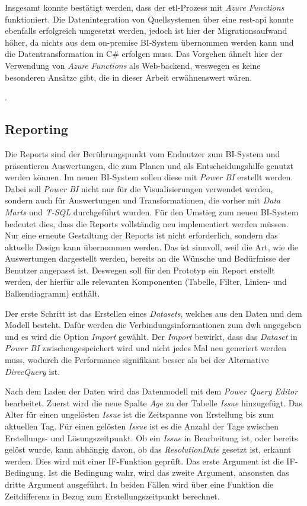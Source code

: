 Insgesamt konnte bestätigt werden, dass der \ac{etl}-Prozess mit \textit{Azure Functions} funktioniert. Die Datenintegration von Quellsystemen über eine \ac{rest}-\ac{api} konnte ebenfalls erfolgreich umgesetzt werden, jedoch ist hier der Migrationsaufwand höher, da nichts aus dem on-premise BI-System übernommen werden kann und die Datentransformation in C\# erfolgen muss. Das Vorgehen ähnelt hier der Verwendung von \textit{Azure Functions} als Web-backend, weswegen es keine besonderen Ansätze gibt, die in dieser Arbeit erwähnenswert wären.

\cite[vgl.][]{kurniawan_practical_2019, satapathi_hands-azure_2021, sreeram_azure_2020}.

\subsection{Reporting}
Die Reports sind der Berührungspunkt vom Endnutzer zum BI-System und präsentieren Auswertungen, die zum Planen und als Entscheidungshilfe genutzt werden können. Im neuen BI-System sollen diese mit \textit{Power BI} erstellt werden. Dabei soll \textit{Power BI} nicht nur für die Visualisierungen verwendet werden, sondern auch für Auswertungen und Transformationen, die vorher mit \textit{Data Marts} und \textit{T-SQL} durchgeführt wurden. Für den Umstieg zum neuen BI-System bedeutet dies, dass die Reports vollständig neu implementiert werden müssen. Nur eine erneute Gestaltung der Reports ist nicht erforderlich, sondern das aktuelle Design kann übernommen werden. Das ist sinnvoll, weil die Art, wie die Auswertungen dargestellt werden, bereits an die Wünsche und Bedürfnisse der Benutzer angepasst ist. Deswegen soll für den Prototyp ein Report erstellt werden, der hierfür alle relevanten Komponenten (Tabelle, Filter, Linien- und Balkendiagramm) enthält.

Der erste Schritt ist das Erstellen eines \textit{Datasets}, welches aus den Daten und dem Modell besteht. Dafür werden die Verbindungsinformationen zum \ac{dwh} angegeben und es wird die Option \textit{Import} gewählt. Der \textit{Import} bewirkt, dass das \textit{Dataset} in \textit{Power BI} zwischengespeichert wird und nicht jedes Mal neu generiert werden muss, wodurch die Performance signifikant besser als bei der Alternative \textit{DirecQuery} ist.

Nach dem Laden der Daten wird das Datenmodell mit dem \textit{Power Query Editor} bearbeitet. Zuerst wird die neue Spalte \textit{Age} zu der Tabelle \textit{Issue} hinzugefügt. Das Alter für einen ungelösten \textit{Issue} ist die Zeitspanne von Erstellung bis zum aktuellen Tag. Für einen gelösten \textit{Issue} ist es die Anzahl der Tage zwischen Erstellungs- und Lösungszeitpunkt. Ob ein \textit{Issue} in Bearbeitung ist, oder bereits gelöst wurde, kann abhängig davon, ob das \textit{ResolutionDate} gesetzt ist, erkannt werden. Dies wird mit einer IF-Funktion geprüft. Das erste Argument ist die IF-Bedingung. Ist die Bedingung wahr, wird das zweite Argument, ansonsten das dritte Argument ausgeführt. In beiden Fällen wird über eine Funktion die Zeitdifferenz in Bezug zum Erstellungszeitpunkt berechnet.


